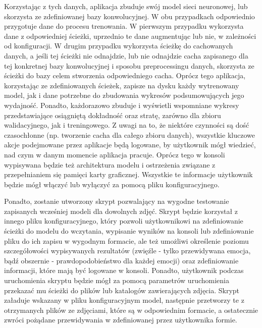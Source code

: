 Korzystając z tych danych, aplikacja zbuduje swój model sieci neuronowej, lub skorzysta ze zdefiniowanej bazy konwolucyjnej. W obu przypadkach odpowiednio przygotuje dane do procesu trenowania. W pierwszym przypadku wykorzysta dane z odpowiedniej ścieżki, uprzednio te dane augmentując lub nie, w zależności od konfiguracji. W drugim przypadku wykorzysta ścieżkę do cachowanych danych, a jeśli tej ścieżki nie odnajdzie, lub nie odnajdzie cacha zapisanego dla tej konkretnej bazy konwolucyjnej i sposobu preprocessingu danych, skorzysta ze ścieżki do bazy celem stworzenia odpowiedniego cacha. Oprócz tego aplikacja, korzystając ze zdefiniowanych ścieżek, zapisze na dysku każdy wytrenowany model, jak i dane potrzebne do zbudowania wykresów podsumowujących jego wydajność. Ponadto, każdorazowo zbuduje i wyświetli wspomniane wykresy przedstawiające osiągniętą dokładność oraz stratę, zarówno dla zbioru walidacyjnego, jak i treningowego. Z uwagi na to, że niektóre czynności są dość czasochłonne (np. tworzenie cacha dla całego zbioru danych), wszystkie kluczowe akcje podejmowane przez aplikacje będą logowane, by użytkownik mógł wiedzieć, nad czym w danym momencie aplikacja pracuje. Oprócz tego w konsoli wypisywana będzie też architektura modelu i ostrzeżenia związane z przepełnianiem się pamięci karty graficznej. Wszystkie te informacje użytkownik będzie mógł włączyć lub wyłączyć za pomocą pliku konfiguracyjnego.

Ponadto, zostanie utworzony skrypt pozwalający na wygodne testowanie zapisanych wcześniej modeli dla dowolnych zdjęć. Skrypt będzie korzystał z innego pliku konfiguracyjnego, który pozwoli użytkownikowi na zdefiniowanie ścieżki do modelu do wczytania, wypisanie wyników na konsoli lub zdefiniowanie pliku do ich zapisu w wygodnym formacie, ale też umożliwi określenie poziomu szczegółowości wypisywanych rezultatów (zwięźle - tylko przewidywana emocja, bądź obszernie - prawdopodobieństwo dla każdej emocji) oraz zdefiniowanie informacji, które mają być logowane w konsoli. Ponadto, użytkownik podczas uruchomienia skryptu będzie mógł za pomocą parametrów uruchomienia przekazać mu ścieżki do plików lub katalogów zawierających zdjęcia. Skrypt załaduje wskazany w pliku konfiguracyjnym model, następnie przetworzy te z otrzymanych plików ze zdjęciami, które są w odpowiednim formacie, a ostatecznie zwróci pożądane przewidywania w zdefiniowanej przez użytkownika formie. 
